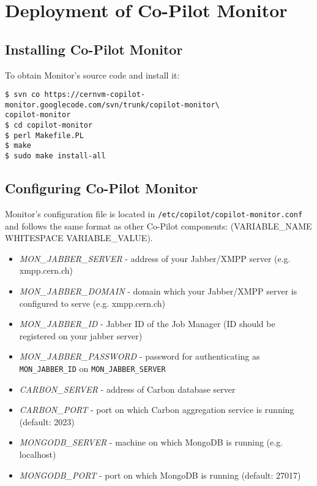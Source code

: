\section{Deployment of Co-Pilot Monitor}

\subsection{Installing Co-Pilot Monitor}

To obtain Monitor's source code and install it:
\lstset{caption=Installing the Monitor}
\begin{lstlisting}
$ svn co https://cernvm-copilot-monitor.googlecode.com/svn/trunk/copilot-monitor\
copilot-monitor
$ cd copilot-monitor
$ perl Makefile.PL
$ make
$ sudo make install-all
\end{lstlisting}

\subsection{Configuring Co-Pilot Monitor}

Monitor's configuration file is located in \texttt{/etc/copilot/copilot-monitor.conf} and follows the same format as other Co-Pilot components: (VARIABLE\_NAME WHITESPACE VARIABLE\_VALUE).

\begin{itemize}
  \item \emph{MON\_JABBER\_SERVER} - address of your Jabber/XMPP server (e.g. xmpp.cern.ch)
  \item \emph{MON\_JABBER\_DOMAIN} - domain which your Jabber/XMPP server is configured to serve (e.g. xmpp.cern.ch)
  \item \emph{MON\_JABBER\_ID} - Jabber ID of the Job Manager (ID should be registered on your jabber server)
  \item \emph{MON\_JABBER\_PASSWORD} - password for authenticating as \texttt{MON\_JABBER\_ID} on \texttt{MON\_JABBER\_SERVER}
  \item \emph{CARBON\_SERVER} - address of Carbon database server
  \item \emph{CARBON\_PORT} - port on which Carbon aggregation service is running (default: 2023)
  \item \emph{MONGODB\_SERVER} - machine on which MongoDB is running (e.g. localhost)
  \item \emph{MONGODB\_PORT} - port on which MongoDB is running (default: 27017)
\end{itemize}

